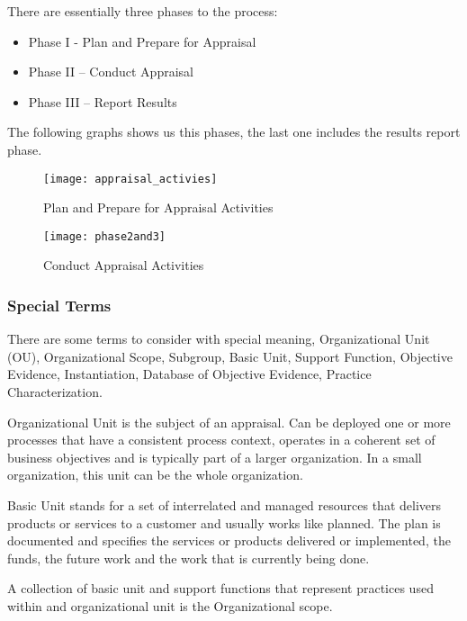 There are essentially three phases to the process:
\begin{itemize}
	\item Phase I - Plan and Prepare for Appraisal 
	\item Phase II – Conduct Appraisal
	\item Phase III – Report Results
\end{itemize}

The following graphs shows us this phases, the last one includes the results report phase.

\begin{figure}[h]
	\begin{center}
		\leavevmode
		\texttt{[image: appraisal\_activies]}
		\caption{Plan and Prepare for Appraisal Activities}
		\label{fig:plan_appraisal}
	\end{center}
\end{figure}


\begin{figure}[h]
	\begin{center}
		\leavevmode
		\texttt{[image: phase2and3]}
		\caption{Conduct Appraisal Activities}
		\label{fig:results_appraisal}
	\end{center}
\end{figure}

\subsubsection{Special Terms}
There are some terms to consider with special meaning, Organizational Unit (OU), Organizational Scope, Subgroup, Basic Unit, Support Function, Objective Evidence, Instantiation, Database of Objective Evidence, Practice Characterization.

Organizational Unit is the subject of an appraisal. Can be deployed one or more processes that have a consistent process context, operates in a coherent set of business objectives and is typically part of a larger organization. In a small organization, this unit can be the whole organization.

Basic Unit stands for a set of interrelated and managed resources that delivers products or services to a customer and usually works like planned. The plan is documented and specifies the services or products delivered or implemented, the funds, the future work and the work that is currently being done.

A collection of basic unit and support functions that represent practices used within and organizational unit is the Organizational scope.


